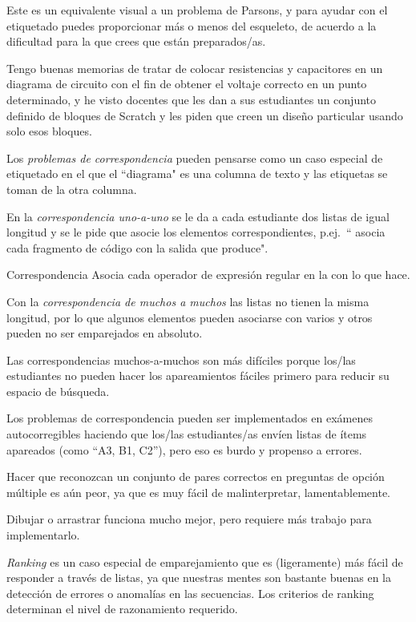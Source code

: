 Este es un equivalente visual a un problema de Parsons, 
y para ayudar con el etiquetado puedes proporcionar más o menos del esqueleto, de acuerdo a la dificultad para la que crees que están preparados/as.

Tengo buenas memorias de tratar de colocar resistencias y capacitores en un diagrama de circuito con el fin de obtener el voltaje correcto en un punto determinado, y he visto docentes que les dan a sus estudiantes un conjunto definido de bloques de Scratch  y les piden que creen un diseño particular usando solo esos bloques.

Los \emph{problemas de correspondencia} pueden pensarse como un caso especial de etiquetado 
en el que el ``diagrama" es una columna de texto 
y las etiquetas se toman de la otra columna.

En la \emph{correspondencia uno-a-uno} se le da a cada estudiante dos listas de igual longitud y se le pide que asocie los elementos correspondientes, 
p.ej.\ `` asocia cada fragmento de código con la salida que produce".

\begin{aside}{Correspondencia}
  Asocia cada operador de expresión regular en la 
  con lo que hace.
\end{aside}


Con la \emph{correspondencia de muchos a muchos} las listas no tienen la misma longitud, por lo que algunos elementos pueden asociarse con varios
y otros pueden no ser emparejados en absoluto.

Las correspondencias muchos-a-muchos son más difíciles 
porque los/las estudiantes no pueden hacer los apareamientos fáciles primero para reducir su espacio de búsqueda.

Los problemas de correspondencia pueden ser implementados en exámenes autocorregibles haciendo que los/las estudiantes/as envíen listas de ítems apareados 
(como ``A3, B1, C2''), 
pero eso es burdo y propenso a errores.

Hacer que reconozcan un conjunto de pares correctos en preguntas de opción múltiple es aún peor, 
ya que es muy fácil de malinterpretar, lamentablemente.

Dibujar o arrastrar funciona mucho mejor, 
pero requiere más trabajo para implementarlo.


\emph{Ranking} es un caso especial de emparejamiento 
que es (ligeramente) más fácil de responder a través de listas, 
ya que nuestras mentes son bastante buenas en la detección de errores o anomalías en las secuencias.
Los criterios de ranking determinan el nivel de razonamiento requerido.

